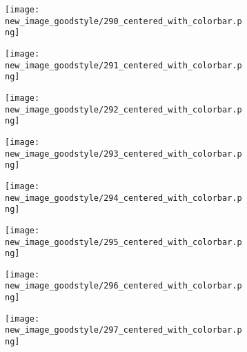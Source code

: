 \documentclass[a4paper,12pt]{article}
\begin{document}
\begin{figure}[H]
  \begin{subfigure}{0.11\textwidth}
    \texttt{[image: new\_image\_goodstyle/290\_centered\_with\_colorbar.png]}
  \end{subfigure}
  \hfill
  \begin{subfigure}{0.11\textwidth}
    \texttt{[image: new\_image\_goodstyle/291\_centered\_with\_colorbar.png]}
  \end{subfigure}
  \hfill
  \begin{subfigure}{0.11\textwidth}
    \texttt{[image: new\_image\_goodstyle/292\_centered\_with\_colorbar.png]}
  \end{subfigure}
  \hfill
  \begin{subfigure}{0.11\textwidth}
    \texttt{[image: new\_image\_goodstyle/293\_centered\_with\_colorbar.png]}
  \end{subfigure}
  \hfill
  \begin{subfigure}{0.11\textwidth}
    \texttt{[image: new\_image\_goodstyle/294\_centered\_with\_colorbar.png]}
  \end{subfigure}
  \hfill
  \begin{subfigure}{0.11\textwidth}
    \texttt{[image: new\_image\_goodstyle/295\_centered\_with\_colorbar.png]}
  \end{subfigure}
  \hfill
  \begin{subfigure}{0.11\textwidth}
    \texttt{[image: new\_image\_goodstyle/296\_centered\_with\_colorbar.png]}
  \end{subfigure}
  \hfill
  \begin{subfigure}{0.11\textwidth}
    \texttt{[image: new\_image\_goodstyle/297\_centered\_with\_colorbar.png]}
  \end{subfigure}
  \hfill
\end{figure}
\end{document}
